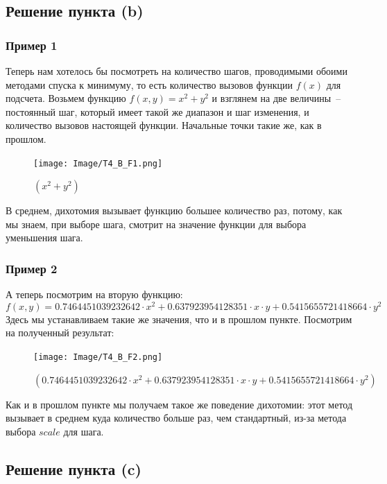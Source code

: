 \documentclass[12pt, a4paper, oneside, final]{article}
\begin{document}
	\subsection*{Решение пункта (b)}
	\subsubsection*{Пример 1}
	Теперь нам хотелось бы посмотреть на количество шагов, проводимыми обоими методами спуска к минимуму, то есть количество вызовов функции $f(x)$ для подсчета. Возьмем функцию $f(x, y) = x^{2} + y^{2}$ и взглянем на две величины~-- постоянный шаг, который имеет такой же диапазон и шаг изменения, и количество вызовов настоящей функции. Начальные точки такие же, как в прошлом.
	\begin{figure}[H]
		\centering
		\texttt{[image: Image/T4\_B\_F1.png]}
		\caption{$(x^{2} + y^{2})$}
	\end{figure}
	В среднем, дихотомия вызывает функцию большее количество раз, потому, как мы знаем, при выборе шага, смотрит на значение функции для выбора уменьшения шага.
	\subsubsection*{Пример 2}
	А теперь посмотрим на вторую функцию:
	\[
		f(x, y) = 0.7464451039232642 \cdot x^{2} + 0.637923954128351 \cdot x \cdot y + 0.5415655721418664 \cdot y^{2}
	\]
	Здесь мы устанавливаем такие же значения, что и в прошлом пункте. Посмотрим на полученный результат:
	\begin{figure}[H]
		\centering
		\texttt{[image: Image/T4\_B\_F2.png]}
		\caption{$(0.7464451039232642 \cdot x^{2} + 0.637923954128351 \cdot x \cdot y + 0.5415655721418664 \cdot y^{2})$}
	\end{figure}
	Как и в прошлом пункте мы получаем такое же поведение дихотомии: этот метод вызывает в среднем куда количество больше раз, чем стандартный, из-за метода выбора $scale$ для шага.
	\subsection*{Решение пункта (c)}
\end{document}
